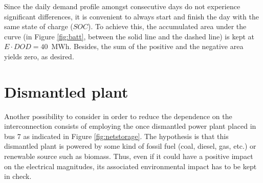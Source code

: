 Since the daily demand profile amongst consecutive days do not experience significant differences, it is convenient to always start and finish the day with the same state of charge ($SOC$). To achieve this, the accumulated area under the curve (in Figure \ref{fig:batt}, between the solid line and the dashed line) is kept at $E \cdot DOD=40$~MWh. Besides, the sum of the positive and the negative area yields zero, as desired. 


\section{Dismantled plant}
Another possibility to consider in order to reduce the dependence on the interconnection consists of employing the once dismantled power plant placed in bus 7 as indicated in Figure \ref{fig:netstorage}. The hypothesis is that this dismantled plant is powered by some kind of fossil fuel (coal, diesel, gas, etc.) or renewable source such as biomass. Thus, even if it could have a positive impact on the electrical magnitudes, its associated environmental impact has to be kept in check. 

